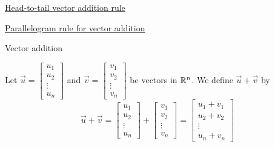 \documentclass{ximera}
\begin{document}
\href{https://ximera.osu.edu/oerlinalg/LinearAlgebra/VEC-0030/main}{Head-to-tail vector addition rule}

\href{https://ximera.osu.edu/oerlinalg/LinearAlgebra/VEC-0030/main}{Parallelogram rule for vector addition}

Vector addition
\begin{expandable}
  Let $\vec{u}=\begin{bmatrix}
u_1\\
u_2\\
\vdots\\
u_n
\end{bmatrix}$ and $\vec{v}=\begin{bmatrix}
v_1\\
v_2\\
\vdots\\
v_n
\end{bmatrix}$ be vectors in $\mathbb{R}^n$.  We define $\vec{u}+\vec{v}$ by
  $$\vec{u}+\vec{v}=\begin{bmatrix}
u_1\\
u_2\\
\vdots\\
u_n
\end{bmatrix}+\begin{bmatrix}
v_1\\
v_2\\
\vdots\\
v_n
\end{bmatrix}=\begin{bmatrix}
u_1+v_1\\
u_2+v_2\\
\vdots\\
u_n+v_n
\end{bmatrix}$$
  \end{expandable}
\end{document}
